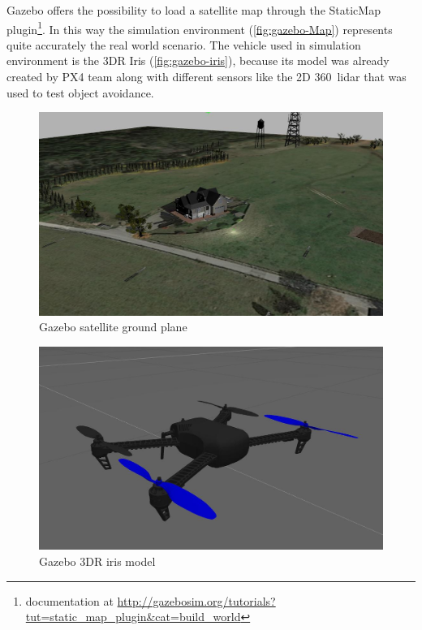 Gazebo offers the possibility to load a satellite map through the \textsf{StaticMap} plugin\footnote{documentation at \url{http://gazebosim.org/tutorials?tut=static_map_plugin&cat=build_world}}. In this way the simulation environment (\autoref{fig:gazebo-Map}) represents quite accurately the real world scenario.
The vehicle used in simulation environment is the 3DR Iris (\autoref{fig:gazebo-iris}), because its model was already created by PX4 team along with different sensors like the 2D 360\degree\ lidar that was used to test object avoidance.
\begin{figure}[ht]
  \centering
  \includegraphics[width=.7\linewidth]{figures/C4/simulation/gazebo-bambi-world.jpg}
  \caption{Gazebo satellite ground plane}
  \label{fig:gazebo-Map}
\end{figure}
\begin{figure}[ht]
  \centering
  \includegraphics[width=.5\linewidth]{figures/C4/simulation/iris-model1.jpg}
  \caption{Gazebo 3DR iris model}
  \label{fig:gazebo-iris}
\end{figure}

